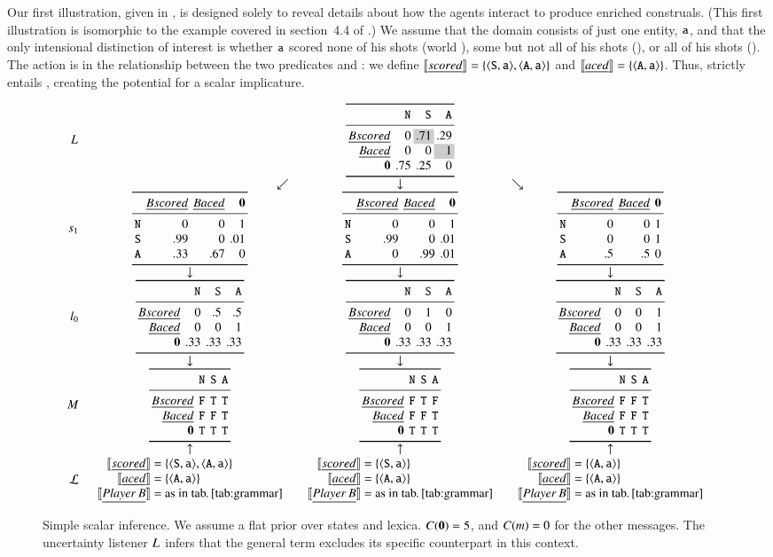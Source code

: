 \documentclass[leqno,12pt]{article}
\begin{document}
Our first illustration, given in , is
designed solely to reveal details about how the agents interact to
produce enriched construals. (This first illustration is isomorphic to
the example covered in section~4.4 of
\citealp{Bergen:Levy:Goodman:2014}.) We assume that the domain
consists of just one entity, $\texttt{a}$, and that the only intensional
distinction of interest is whether $\texttt{a}$ scored none of his shots
(world ), some but not all of his shots (), or all
of his shots (). The action is in the relationship between
the two predicates  and : we define
$\llbracket\emph{scored\/}\rrbracket = \left\{ \langle \texttt{S}, \texttt{a} \rangle,
  \langle \texttt{A}, \texttt{a} \rangle \right\}$
and $\llbracket\emph{aced\/}\rrbracket = \left\{ \langle \texttt{A}, \texttt{a} \rangle \right\}$. Thus,
 strictly entails , creating the potential for
a scalar implicature.

\begin{figure}[!t]
  \[
  \setlength{\arraycolsep}{5pt}
  \begin{array}{r c c c}
    \UncertaintyListener &
    & \genericscalar{0}{\graycell{.71}}{.29}{0}{0}{\graycell{1}}{.75}{.25}{0}
    \\
    & \multicolumn{1}{r}{\swarrow}& \multicolumn{1}{c}{\downarrow}& \multicolumn{1}{l}{\searrow}
    \\
    \speakerOne
    &
    \scalarspeaker{0}{0}{1}{.99}{0}{.01}{.33}{.67}{0}
    &
    \scalarspeaker{0}{0}{1}{.99}{0}{.01}{0}{.99}{.01}
    &
    \scalarspeaker{0}{0}{1}{0}{0}{1}{.5}{.5}{0}
    \\
    & \downarrow & \downarrow & \downarrow
    \\
    \listenerZero
    &
    \genericscalar{0}{.5}{.5}{0}{0}{1}{.33}{.33}{.33}
    &
    \genericscalar{0}{1}{0}{0}{0}{1}{.33}{.33}{.33}
    &
    \genericscalar{0}{0}{1}{0}{0}{1}{.33}{.33}{.33}
    \\
    & \downarrow & \downarrow & \downarrow 
    \\    
    \Messages
    &
    \genericscalar{\False}{\True}{\True}{\False}{\False}{\True}{\True}{\True}{\True}
    &
    \genericscalar{\False}{\True}{\False}{\False}{\False}{\True}{\True}{\True}{\True}
    &
    \genericscalar{\False}{\False}{\True}{\False}{\False}{\True}{\True}{\True}{\True}
    \\
    & \uparrow & \uparrow & \uparrow 
    \\                               
    \Lex
    & 
    \scalarlex{\tuple{\world{S},\playera}, \tuple{\world{A},\playera}}
    & 
    \scalarlex{\tuple{\world{S},\playera}}
    &
    \scalarlex{\tuple{\world{A},\playera}}   
  \end{array}
  \]
  \caption{Simple scalar inference. 
    We assume a flat prior over states and lexica. 
    $C(\mathbf{0}) = 5$, and $C(m) = 0$ for the other messages. 
    The uncertainty listener $L_{}$ infers that the general term 
     excludes its specific counterpart  in this context.}
  \label{fig:simplescalar}
\end{figure}
\end{document}
